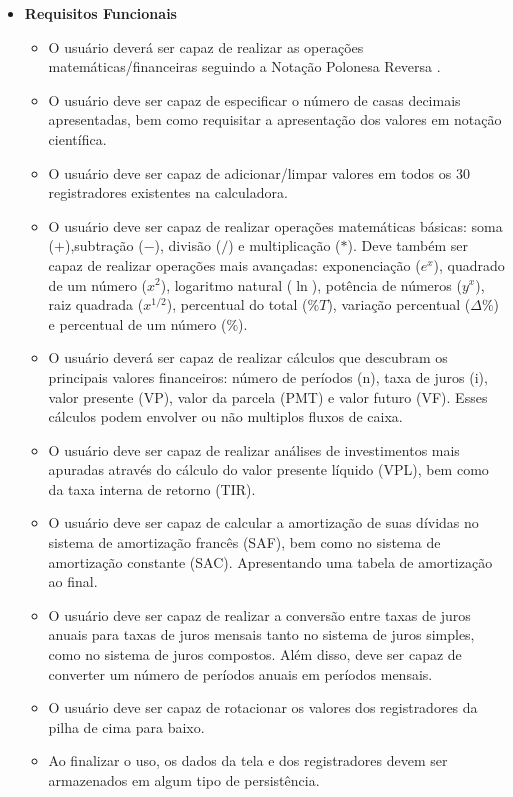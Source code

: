 \begin{itemize}
 \item \textbf{Requisitos Funcionais}
	\begin{itemize}
 	\item O usuário deverá ser capaz de realizar as operações matemáticas/financeiras seguindo a Notação Polonesa Reversa \cite{NPR}.
	\item O usuário deve ser capaz de especificar o número de casas decimais apresentadas, bem como requisitar a apresentação dos valores em notação científica.
	\item O usuário deve ser capaz de adicionar/limpar valores em todos os 30 registradores existentes na calculadora. 
	\item O usuário deve ser capaz de realizar operações matemáticas básicas: soma ($+$),subtração ($-$), divisão ($/$) e multiplicação ($*$). Deve também ser capaz de realizar operações mais avançadas: exponenciação ($ e^{x} $), quadrado de um número ($x^{2}$), logaritmo natural ($\ln$), potência de números ($y^{x}$), raiz quadrada ($x^{1/2}$), percentual do total ($\%T$), variação percentual ($\Delta\%$) e percentual de um número ($\%$).
	\item O usuário deverá ser capaz de realizar cálculos que descubram os principais valores financeiros: número de períodos (n), taxa de juros (i), valor presente (VP), valor da parcela (PMT) e valor futuro (VF). Esses cálculos podem envolver ou não multiplos fluxos de caixa.
	\item O usuário deve ser capaz de realizar análises de investimentos mais apuradas através do cálculo do valor presente líquido (VPL), bem como da taxa interna de retorno (TIR).
	\item O usuário deve ser capaz de calcular a amortização de suas dívidas no sistema de amortização francês (SAF), bem como no sistema de amortização constante (SAC). Apresentando uma tabela de amortização ao final.
	\item O usuário deve ser capaz de realizar a conversão entre taxas de juros anuais para taxas de juros mensais tanto no sistema de juros simples, como no sistema de juros compostos. Além disso, deve ser capaz de converter um número de períodos anuais em períodos mensais.
	\item O usuário deve ser capaz de rotacionar os valores dos registradores da pilha de cima para baixo.
	\item Ao finalizar o uso, os dados da tela e dos registradores devem ser armazenados em algum tipo de persistência.
	

\end{itemize}
\end{itemize}
